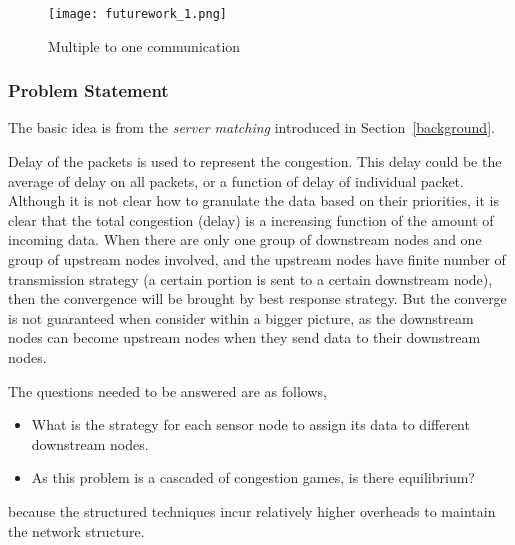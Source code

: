 \begin{figure}[h!]
  \centering
  \texttt{[image: futurework\_1.png]}
  \caption{Multiple to one communication}
  \label{futurework_1}
\end{figure}




\subsubsection*{Problem Statement}
The basic idea is from the \textit{server matching} introduced in Section~\ref{background}.



Delay of the packets is used to represent the congestion.
This delay could be the average of delay on all packets, or a function of delay of individual packet.
Although it is not clear how to granulate the data based on their priorities, it is clear that the total congestion (delay) is a increasing function of the amount of incoming data.
When there are only one group of downstream nodes and one group of upstream nodes involved, and the upstream nodes have finite number of transmission strategy (a certain portion is sent to a certain downstream node), then the convergence will be brought by best response strategy.
But the converge is not guaranteed when consider within a bigger picture, as the downstream nodes can  become upstream nodes when they send data to their downstream nodes.

The questions needed to be answered are as follows,
\begin{itemize}
\item What is the strategy for each sensor node to assign its data to different downstream nodes.
\item As this problem is a cascaded of congestion games, is there equilibrium?


\end{itemize}

 because the structured techniques incur relatively higher overheads to maintain the network structure. 





